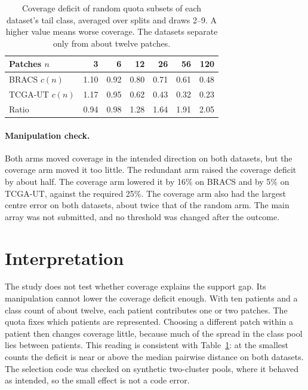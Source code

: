 \documentclass[11pt]{article}
\begin{document}
\begin{table}[ht]
  \centering
  \small
  \begin{tabular}{@{}lrrrrrr@{}}
    \toprule
    Patches $n$ & 3 & 6 & 12 & 26 & 56 & 120 \\
    \midrule
    BRACS $c(n)$   & 1.10 & 0.92 & 0.80 & 0.71 & 0.61 & 0.48 \\
    TCGA-UT $c(n)$ & 1.17 & 0.95 & 0.62 & 0.43 & 0.32 & 0.23 \\
    Ratio          & 0.94 & 0.98 & 1.28 & 1.64 & 1.91 & 2.05 \\
    \bottomrule
  \end{tabular}
  \caption{Coverage deficit of random quota subsets of each dataset's tail class, averaged over splits and draws 2--9. A higher value means worse coverage. The datasets separate only from about twelve patches.}
  \label{tab:curve}
\end{table}

\paragraph{Manipulation check.} Both arms moved coverage in the intended direction on both datasets, but the coverage arm moved it too little. The redundant arm raised the coverage deficit by about half. The coverage arm lowered it by 16\% on BRACS and by 5\% on TCGA-UT, against the required 25\%. The coverage arm also had the largest centre error on both datasets, about twice that of the random arm. The main array was not submitted, and no threshold was changed after the outcome.

\section{Interpretation}
\label{sec:interpretation}
The study does not test whether coverage explains the support gap. Its manipulation cannot lower the coverage deficit enough. With ten patients and a class count of about twelve, each patient contributes one or two patches. The quota fixes which patients are represented. Choosing a different patch within a patient then changes coverage little, because much of the spread in the class pool lies between patients. This reading is consistent with Table~\ref{tab:curve}: at the smallest counts the deficit is near or above the median pairwise distance on both datasets. The selection code was checked on synthetic two-cluster pools, where it behaved as intended, so the small effect is not a code error.
\end{document}
